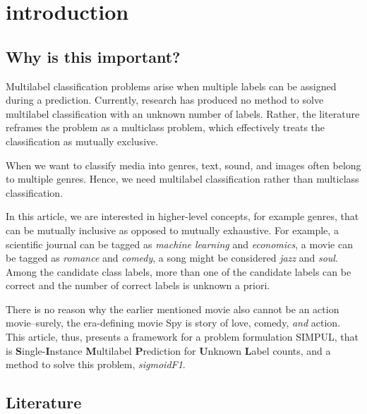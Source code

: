 
\section{introduction}
\label{sec:org662677c}





\subsection{Why is this important?}

Multilabel classification problems arise when multiple labels can be assigned during a prediction. Currently, research has produced no method to solve multilabel classification with an unknown number of labels. Rather, the literature reframes the problem as a multiclass problem, which effectively treats the classification as mutually exclusive. 

When we want to classify media into genres, text, sound, and images often belong to multiple genres. Hence, we need multilabel classification rather than multiclass classification. 

In this article, we are interested in higher-level concepts, for example genres, that can be mutually inclusive as opposed to mutually exhaustive. For example, a scientific journal can be tagged as \emph{machine learning} and \emph{economics}, a movie can be tagged as \emph{romance} and \emph{comedy}, a song might be considered \emph{jazz} and \emph{soul}. Among the candidate class labels, more than one of the candidate labels can be correct and the number of correct labels is unknown a priori. 



There is no reason why the earlier mentioned movie also cannot be an action movie–surely, the era-defining movie Spy is story of love, comedy, \textit{and} action. This article, thus, presents a framework for a problem formulation  SIMPUL, that is \textbf{S}ingle-\textbf{I}nstance \textbf{M}ultilabel \textbf{P}rediction for \textbf{U}nknown \textbf{L}abel counts, and a method to solve this problem, \emph{sigmoidF1}. 

\subsection{Literature}


